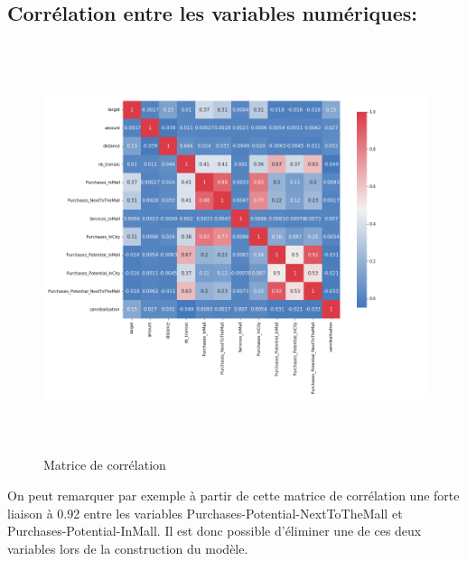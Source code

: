\subsection{Corrélation entre les variables numériques:}
\begin{figure}[h]
\begin{center}
\includegraphics[width=18cm,height=12cm]{images/matrix_corelation.png}
\caption[Matrice de corrélation]{Matrice de corrélation}
\label{monlabel}
\end{center}
\end{figure}
On peut remarquer par exemple à partir de cette matrice de corrélation une forte liaison à 0.92 entre les variables Purchases-Potential-NextToTheMall et Purchases-Potential-InMall. Il est donc possible d’éliminer une de ces deux variables lors de la construction du modèle.

\newpage

